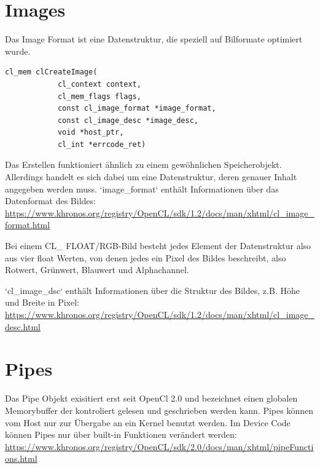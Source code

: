 	    \section{Images}
	    Das Image Format ist eine Datenstruktur, die speziell auf Bilformate optimiert wurde.
	    \begin{lstlisting}[caption=OpenCL Images]
	    cl_mem clCreateImage(
		    cl_context context, 
		    cl_mem_flags flags,
		    const cl_image_format *image_format,
		    const cl_image_desc *image_desc,
		    void *host_ptr,
		    cl_int *errcode_ret)
	    \end{lstlisting}	
			
	    Das Erstellen funktioniert ähnlich zu einem gewöhnlichen Speicherobjekt. Allerdings handelt es sich dabei um eine Datenstruktur, deren genauer Inhalt angegeben werden muss. \li`image_format` enthält Informationen über das Datenformat des Bildes: \url{https://www.khronos.org/registry/OpenCL/sdk/1.2/docs/man/xhtml/cl_image_format.html}
		
	    Bei einem CL\_ FLOAT/RGB-Bild besteht jedes Element der Datenstruktur also aus vier float Werten, von denen jedes ein Pixel des Bildes beschreibt, also Rotwert, Grünwert, Blauwert und \mbox{Alphachannel}.
		
	    \li`cl_image_dsc` enthält Informationen über die Struktur des Bildes, z.B. Höhe und Breite in Pixel: \href{https://www.khronos.org/registry/OpenCL/sdk/1.2/docs/man/xhtml/cl_image_desc.html}{\small https://www.khronos.org/registry/OpenCL/sdk/1.2/docs/man/xhtml/cl{\_}image{\_}desc.html}
		
	    \section{Pipes}
	    Das Pipe Objekt exisitiert erst seit OpenCl 2.0 und bezeichnet einen globalen Memorybuffer der kontroliert gelesen und geschrieben werden kann. Pipes können vom Host nur zur Übergabe an ein \Gls{Kernel} benutzt werden. Im Device Code können Pipes nur über built-in Funktionen verändert werden: \href{https://www.khronos.org/registry/OpenCL/sdk/2.0/docs/man/xhtml/pipeFunctions.html}{\small https://www.khronos.org/registry/OpenCL/sdk/2.0/docs/man/xhtml/pipeFunctions.html}
		
